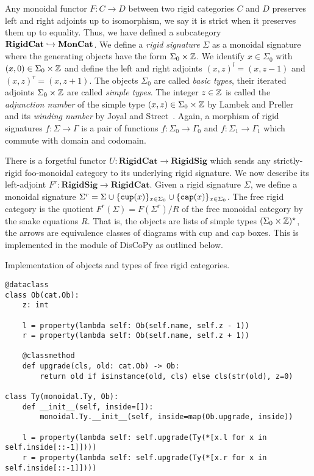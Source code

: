 Any monoidal functor $F : C \to D$ between two rigid categories $C$ and $D$ preserves left and right adjoints up to isomorphism, we say it is strict when it preserves them up to equality.
Thus, we have defined a subcategory $\mathbf{RigidCat} \hookrightarrow \mathbf{MonCat}$.
We define a \emph{rigid signature} $\Sigma$ as a monoidal signature where the generating objects have the form $\Sigma_0 \times \mathbb{Z}$.
We identify $x \in \Sigma_0$ with $(x, 0) \in \Sigma_0 \times \mathbb{Z}$ and define the left and right adjoints $(x, z)^l = (x, z - 1)$ and $(x, z)^r = (x, z + 1)$.
The objects $\Sigma_0$ are called \emph{basic types}, their iterated adjoints $\Sigma_0 \times \mathbb{Z}$ are called \emph{simple types}.
The integer $z \in \mathbb{Z}$ is called the \emph{adjunction number} of the simple type $(x, z) \in \Sigma_0 \times \mathbb{Z}$ by Lambek and Preller~\cite{PrellerLambek07} and its \emph{winding number} by Joyal and Street~\cite{JoyalStreet88}.
Again, a morphism of rigid signatures $f : \Sigma \to \Gamma$ is a pair of functions $f : \Sigma_0 \to \Gamma_0$ and $f : \Sigma_1 \to \Gamma_1$ which commute with domain and codomain.

There is a forgetful functor $U : \mathbf{RigidCat} \to \mathbf{RigidSig}$ which sends any strictly-rigid foo-monoidal category to its underlying rigid signature.
We now describe its left-adjoint $F^r : \mathbf{RigidSig} \to \mathbf{RigidCat}$.
Given a rigid signature $\Sigma$, we define a monoidal signature $\Sigma^r = \Sigma \cup \{ \mathtt{cup} (x) \}_{x \in \Sigma_0} \cup \{ \mathtt{cap} (x) \}_{x \in \Sigma_0}$.
The free rigid category is the quotient $F^r(\Sigma) = F(\Sigma^r) / R$ of the free monoidal category by the snake equations $R$.
That is, the objects are lists of simple types $(\Sigma_0 \times \mathbb{Z})^\star$, the arrows are equivalence classes of diagrams with cup and cap boxes.
This is implemented in the  module of DisCoPy as outlined below.

\begin{python}
{\normalfont Implementation of objects and types of free rigid categories.}

\begin{verbatim}
@dataclass
class Ob(cat.Ob):
    z: int

    l = property(lambda self: Ob(self.name, self.z - 1))
    r = property(lambda self: Ob(self.name, self.z + 1))

    @classmethod
    def upgrade(cls, old: cat.Ob) -> Ob:
        return old if isinstance(old, cls) else cls(str(old), z=0)

class Ty(monoidal.Ty, Ob):
    def __init__(self, inside=[]):
        monoidal.Ty.__init__(self, inside=map(Ob.upgrade, inside))

    l = property(lambda self: self.upgrade(Ty(*[x.l for x in self.inside[::-1]])))
    r = property(lambda self: self.upgrade(Ty(*[x.r for x in self.inside[::-1]])))
\end{verbatim}
\end{python}

